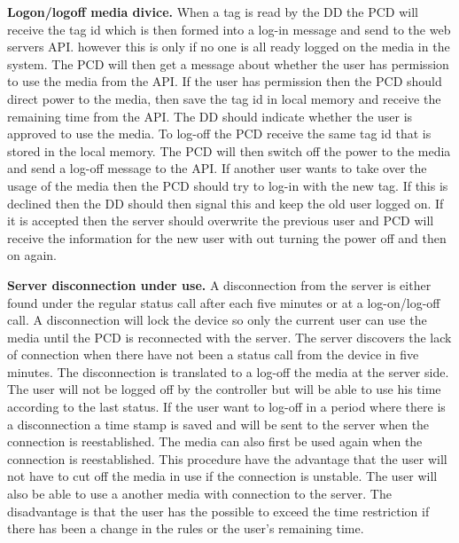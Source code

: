 \textbf{Logon/logoff media divice.} \newline
When a tag is read by the DD the PCD will receive the tag id which is then formed into a log-in message and send to the web servers API. however this is only if no one is all ready logged on the media in the system. The PCD will then get a message about whether the user has permission to use the media from the API. If the user has permission then the PCD should direct power to the media, then save the tag id in local memory and receive the remaining time from the API. The DD should indicate whether the user is approved to use the media.\newline 
To log-off the PCD receive the same tag id that is stored in the local memory. The PCD will then switch off the power to the media and send a log-off message to the API. \newline
If another user wants to take over the usage of the media then the PCD should try to log-in with the new tag. If this is declined then the DD should then signal this and keep the old user logged on. If it is accepted then the server should overwrite the previous user and PCD will receive the information for the new user with out turning the power off and then on again.\newline


\textbf{Server disconnection under use.} \newline
A disconnection from the server is either found under the regular status call after each five minutes or at a log-on/log-off call. A disconnection will lock the device so only the current user can use the media until the PCD is reconnected with the server. The server discovers the lack of connection when there have not been a status call from the device in five minutes. The disconnection is translated to a log-off the media at the server side. 
The user will not be logged off by the controller but will be able to use his time according to the last status. If the user want to log-off in a period where there is a disconnection a time stamp is saved and will be sent to the server when the connection is reestablished. The media can also first be used again when the connection is reestablished. 
This procedure have the advantage that the user will not have to cut off the media in use if the connection is unstable. The user will also be able to use a another media with connection to the server.
The disadvantage is that the user has the possible to exceed the time restriction if there has been a change in the rules or the user's remaining time. 
		
